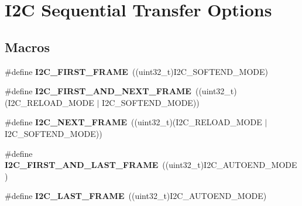 \hypertarget{group___i2_c___x_f_e_r_o_p_t_i_o_n_s}{}\section{I2C Sequential Transfer Options}
\label{group___i2_c___x_f_e_r_o_p_t_i_o_n_s}
\subsection*{Macros}
\begin{DoxyCompactItemize}
\item 
\mbox{\label{group___i2_c___x_f_e_r_o_p_t_i_o_n_s_gab23601bfc0eaddbc4823d193b7e49a9c}} 
\#define {\bfseries I2\+C\+\_\+\+F\+I\+R\+S\+T\+\_\+\+F\+R\+A\+ME}~((uint32\+\_\+t)I2\+C\+\_\+\+S\+O\+F\+T\+E\+N\+D\+\_\+\+M\+O\+DE)
\item 
\mbox{\label{group___i2_c___x_f_e_r_o_p_t_i_o_n_s_ga1396d7236a5e1d52c9fd6d182d1f2869}} 
\#define {\bfseries I2\+C\+\_\+\+F\+I\+R\+S\+T\+\_\+\+A\+N\+D\+\_\+\+N\+E\+X\+T\+\_\+\+F\+R\+A\+ME}~((uint32\+\_\+t)(I2\+C\+\_\+\+R\+E\+L\+O\+A\+D\+\_\+\+M\+O\+DE $\vert$ I2\+C\+\_\+\+S\+O\+F\+T\+E\+N\+D\+\_\+\+M\+O\+DE))
\item 
\mbox{\label{group___i2_c___x_f_e_r_o_p_t_i_o_n_s_ga8790cd8bea154c662fc6a6d6ef6b9083}} 
\#define {\bfseries I2\+C\+\_\+\+N\+E\+X\+T\+\_\+\+F\+R\+A\+ME}~((uint32\+\_\+t)(I2\+C\+\_\+\+R\+E\+L\+O\+A\+D\+\_\+\+M\+O\+DE $\vert$ I2\+C\+\_\+\+S\+O\+F\+T\+E\+N\+D\+\_\+\+M\+O\+DE))
\item 
\mbox{\label{group___i2_c___x_f_e_r_o_p_t_i_o_n_s_ga56aa81e0fe6ff902f3b0dd0bc9e11b96}} 
\#define {\bfseries I2\+C\+\_\+\+F\+I\+R\+S\+T\+\_\+\+A\+N\+D\+\_\+\+L\+A\+S\+T\+\_\+\+F\+R\+A\+ME}~((uint32\+\_\+t)I2\+C\+\_\+\+A\+U\+T\+O\+E\+N\+D\+\_\+\+M\+O\+DE)
\item 
\mbox{\label{group___i2_c___x_f_e_r_o_p_t_i_o_n_s_gaf732cc5827622242ce14645f67749f40}} 
\#define {\bfseries I2\+C\+\_\+\+L\+A\+S\+T\+\_\+\+F\+R\+A\+ME}~((uint32\+\_\+t)I2\+C\+\_\+\+A\+U\+T\+O\+E\+N\+D\+\_\+\+M\+O\+DE)
\item 

\end{DoxyCompactItemize}

